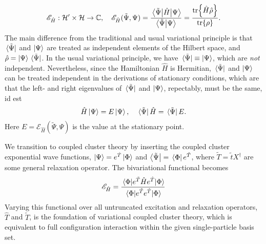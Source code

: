 \begin{equation}
    \label{eq:bivariational_principle}
    \mathscr{E}_{\hat{H}} : \mathcal{H}' \times \mathcal{H} \to \mathbb{C},
    \quad
    \mathscr{E}_{\hat{H}}(\tilde{\Psi}, \Psi) 
        = \frac{\mel{\tilde{\Psi}}{\hat{H}}{\Psi}}{\braket{\tilde{\Psi}}{\Psi}}
        = \frac{\tr{\hat{H}\hat{\rho}}}{\tr{\rho}}.
\end{equation}
The main difference from the traditional and usual variational principle is that 
$\bra*{\tilde{\Psi}}$ and $\ket{\Psi}$ are treated as independent elements of the
Hilbert space, and $\hat{\rho} = \ket{\Psi}\bra*{\tilde{\Psi}}$. In the usual 
variational principle, we have 
$\bra*{\tilde{\Psi}} \equiv \ket{\Psi}$, which are \emph{not} independent. Nevertheless,
since the Hamiltonian $\hat{H}$ is Hermitian, $\bra*{\tilde{\Psi}}$ and $\ket{\Psi}$
can be treated 
independent in the derivations of stationary conditions, which are that the left- 
and right eigenvalues of $\bra*{\tilde{\Psi}}$ and $\ket{\Psi}$, repectably, must be
the same, id est 
\begin{equation}
    \hat{H}\ket{\Psi} = E\ket{\Psi}, \quad \bra*{\tilde{\Psi}}\hat{H} = \bra*{\tilde{\Psi}}E.
\end{equation}
Here $E = \mathcal{E}_{\hat{H}}(\tilde{\Psi}, \Psi)$ is the value at the stationary point.

We transition to coupled cluster theory by inserting the coupled cluster exponential 
wave functions, $\ket{\Psi} = e^{\hat{T}}\ket{\Phi}$ and 
$\bra{\tilde{\Psi}} = \bra*{\Phi}e^{\tilde{T}}$, where 
$\tilde{T} = \tilde{t}X^\dagger$ are some general relaxation operator. The 
bivariational functional becomes 
\begin{equation}
    \label{eq:bivariational_principle_cc}
    \mathscr{E}_{\hat{H}} 
    = \frac{\mel{\Phi}{e^{\tilde{T}}\hat{H}e^{\hat{T}}}{\Phi}}
        {\mel{\Phi}{e^{\tilde{T}}e^{\hat{T}}}{\Phi}}
\end{equation}
Varying this functional over all untruncated excitation and relaxation operators,
$\hat{T}$ and $\tilde{T}$, is the foundation of variational coupled cluster
theory\cite{bartlett1988expectation}, which is equivalent to full configuration 
interaction within the given single-particle basis set.

